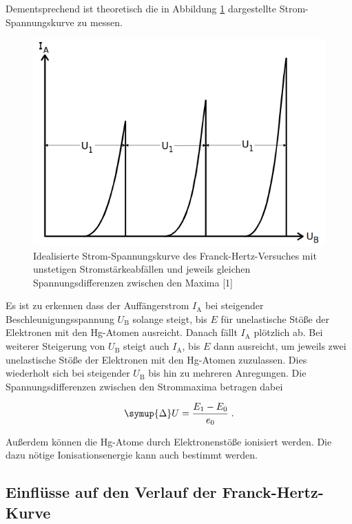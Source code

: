 Dementsprechend ist theoretisch die in Abbildung \ref{fig:bild2} dargestellte Strom-Spannungskurve zu messen.

\begin{figure} [H]
    \centering
    \includegraphics[scale=0.4]{content/bild2.png}
    \caption{Idealisierte Strom-Spannungskurve des Franck-Hertz-Versuches mit unstetigen Stromstärkeabfällen und jeweils
    gleichen Spannungsdifferenzen zwischen den Maxima [1]}
    \label{fig:bild2}
  \end{figure}

  Es ist zu erkennen dass der Auffängerstrom $I_\text{A}$ bei steigender Beschleunigungsspannung $U_\text{B}$
  solange steigt, bis $E$ für unelastische Stöße der Elektronen mit den Hg-Atomen ausreicht. Danach
  fällt $I_\text{A}$ plötzlich ab. Bei weiterer Steigerung von $U_\text{B}$ steigt auch $I_\text{A}$,
  bis $E$ dann ausreicht, um jeweils zwei unelastische Stöße der Elektronen mit den Hg-Atomen zuzulassen.
  Dies wiederholt sich bei steigender $U_\text{B}$ bis hin zu mehreren Anregungen.
  Die Spannungsdifferenzen zwischen den Strommaxima betragen dabei

  \begin{equation}
      \symup{\Delta}U = \frac{E_1 - E_0}{e_0} \; .
  \end{equation}

Außerdem können die Hg-Atome durch Elektronenstöße ionisiert werden.
Die dazu nötige Ionisationsenergie kann auch bestimmt werden. 


\subsection{Einflüsse auf den Verlauf der Franck-Hertz-Kurve}


